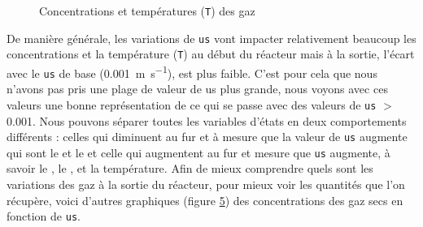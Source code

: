 \documentclass[11pt]{report}
\begin{document}
            \begin{figure}[ht]
                \centering
                \begin{subfigure}[t]{0.325\textwidth}
                    \centering
                    
                    \caption{}
                    \label{graph:con:2:us:CH4}
                \end{subfigure}
                \hfill
                \begin{subfigure}[t]{0.325\textwidth}
                    \centering
                    
                    \caption{}
                    \label{graph:con:2:us:H2}
                \end{subfigure}
                \hfill
                \begin{subfigure}[t]{0.325\textwidth}
                    \centering
                    
                    \caption{}
                    \label{graph:con:2:us:CO}
                \end{subfigure}
                \hfill
                \begin{subfigure}[t]{0.325\textwidth}
                    \centering
                    
                    \caption{}
                    \label{graph:con:2:us:CO2}
                \end{subfigure}
                \caption{Concentrations et températures (\texttt{T}) des gaz}
                \label{graph:con:2:us}
            \end{figure}
            \par
            De manière générale, les variations de \verb|us| vont impacter relativement beaucoup 
            les concentrations et la température (\verb|T|) au début du réacteur mais à la sortie,
            l'écart avec le \verb|us| de base (\SI{0.001}{\meter\per\second}), est plus faible. C'est pour cela que 
            nous n'avons pas pris une plage de valeur de us plus grande, nous voyons avec 
            ces valeurs une bonne représentation de ce qui se passe avec des valeurs de 
            \verb|us| $>$ 0.001. Nous pouvons séparer toutes les variables d'états en deux comportements 
            différents : celles qui diminuent au fur et à mesure que la valeur de \verb|us| augmente
            qui sont le  et le  et celle qui augmentent au fur et mesure que \verb|us| augmente, 
            à savoir le , le , et la température.
            Afin de mieux comprendre quels sont les variations des gaz à la sortie du réacteur, 
            pour mieux voir les quantités que l'on récupère,
            voici d'autres graphiques (figure \ref{graph:con:2:us}) des concentrations des gaz secs en fonction de \verb|us|.
        
\end{document}
